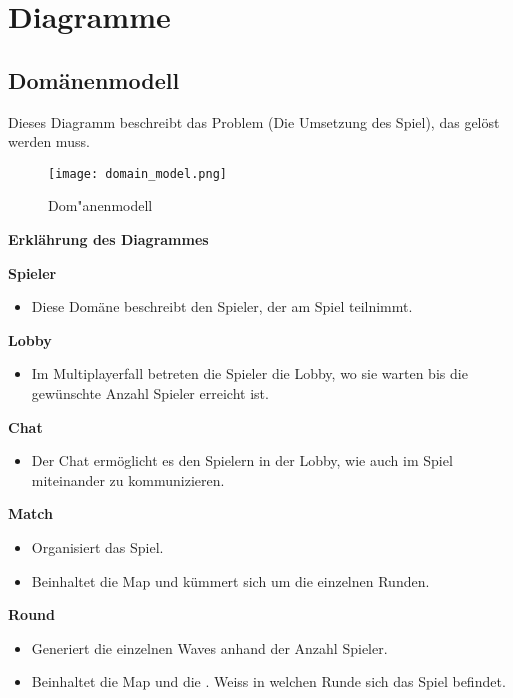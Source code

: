 \section{Diagramme}

\subsection{Domänenmodell}
Dieses Diagramm beschreibt das Problem (Die Umsetzung des Spiel), das gelöst werden muss.

\begin{figure}[htb]
 \begin{center}
  \leavevmode
  \texttt{[image: domain\_model.png]}
 \end{center}
 \caption{Dom"anenmodell}
 \label{fig:Dom"anenmodell}
\end{figure}

\textbf{Erklährung des Diagrammes}

\textbf{Spieler}
\begin{itemize}
\item Diese Domäne beschreibt den Spieler, der am Spiel teilnimmt.
\end{itemize}

\textbf{Lobby}
\begin{itemize}
\item Im Multiplayerfall betreten die Spieler die Lobby, wo sie warten bis die gewünschte Anzahl Spieler erreicht ist. 
\end{itemize}

\textbf{Chat}
\begin{itemize}
\item Der Chat ermöglicht es den Spielern in der Lobby, wie auch im Spiel miteinander zu kommunizieren.
\end{itemize}

\textbf{Match}
\begin{itemize}
\item Organisiert das Spiel.
\item Beinhaltet die Map und kümmert sich um die einzelnen Runden.
\end{itemize}

\textbf{Round}
\begin{itemize}
\item Generiert die einzelnen Waves anhand der Anzahl Spieler.
\item Beinhaltet die Map und die . Weiss in welchen Runde sich das Spiel befindet.
\end{itemize}

